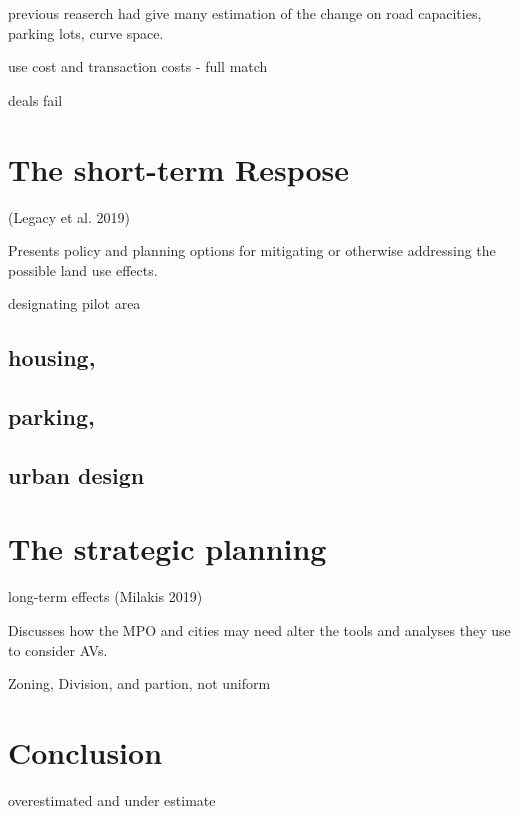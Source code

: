 \documentclass[12pt,]{article}
\begin{document}
previous reaserch had give many estimation of the change on road
capacities, parking lots, curve space.

use cost and transaction costs - full match

deals fail

\hypertarget{the-short-term-respose}{%
\section{The short-term Respose}\label{the-short-term-respose}}

(Legacy et al. 2019)

Presents policy and planning options for mitigating or otherwise
addressing the possible land use effects.

designating pilot area

\hypertarget{housing}{%
\subsection{housing,}\label{housing}}

\hypertarget{parking}{%
\subsection{parking,}\label{parking}}

\hypertarget{urban-design}{%
\subsection{urban design}\label{urban-design}}

\hypertarget{the-strategic-planning}{%
\section{The strategic planning}\label{the-strategic-planning}}

long-term effects (Milakis 2019)

Discusses how the MPO and cities may need alter the tools and analyses
they use to consider AVs.

Zoning, Division, and partion, not uniform

\hypertarget{conclusion}{%
\section{Conclusion}\label{conclusion}}

overestimated and under estimate
\end{document}
